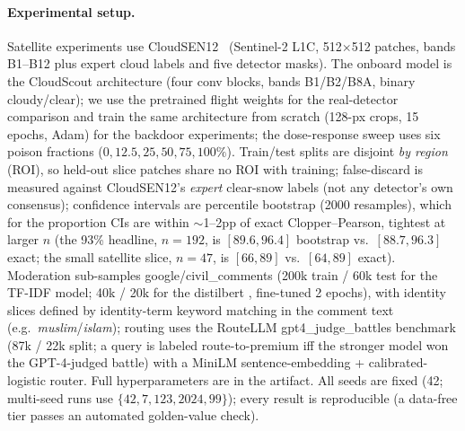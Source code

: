 \documentclass[conference]{IEEEtran}
\begin{document}
\paragraph{Experimental setup.} Satellite experiments use CloudSEN12~\cite{aybar2022} (Sentinel-2 L1C, 512$\times$512 patches,
bands B1--B12 plus expert cloud labels and five detector masks). The onboard model is the CloudScout
architecture (four conv blocks, bands B1/B2/B8A, binary cloudy/clear); we use the pretrained flight weights
for the real-detector comparison and train the same architecture from scratch (128-px crops, 15 epochs, Adam)
for the backdoor experiments; the dose-response sweep uses six poison fractions ($0,12.5,25,50,75,100\%$).
Train/test splits are disjoint \emph{by region} (ROI), so held-out slice patches share no ROI with training;
false-discard is measured against CloudSEN12's \emph{expert} clear-snow labels (not any detector's own
consensus); confidence intervals are percentile bootstrap (2000 resamples), which for the proportion CIs are
within $\sim$1--2pp of exact Clopper--Pearson, tightest at larger $n$ (the 93\% headline, $n{=}192$, is
$[89.6,96.4]$ bootstrap vs.\ $[88.7,96.3]$ exact; the small satellite slice, $n{=}47$, is $[66,89]$ vs.\ $[64,89]$
exact). Moderation sub-samples google/civil\_comments \cite{borkan2019}
(200k train / 60k test for the TF-IDF model; 40k / 20k for the distilbert \cite{sanh2019}, fine-tuned 2 epochs), with identity
slices defined by identity-term keyword matching in the comment text (e.g.\ \emph{muslim}/\emph{islam}); routing uses the RouteLLM \cite{ong2024} gpt4\_judge\_battles
benchmark (87k / 22k split; a query is labeled route-to-premium iff the stronger model won the GPT-4-judged
battle) with a MiniLM \cite{wang2020} sentence-embedding \cite{reimers2019} + calibrated-logistic router. Full hyperparameters are in the artifact. All seeds are fixed (42; multi-seed runs use $\{42,7,123,2024,99\}$);
every result is reproducible (a data-free tier passes an automated golden-value check).
\end{document}
